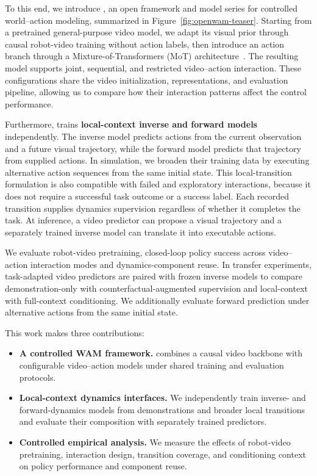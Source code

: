 To this end, we introduce \textbf{\ours}, an open framework and model series for controlled world--action modeling, summarized in Figure~\ref{fig:openwam-teaser}. Starting from a pretrained general-purpose video model, we adapt its visual prior through causal robot-video training without action labels, then introduce an action branch through a Mixture-of-Transformers (MoT) architecture~\cite{liang2024mixture}. The resulting model supports joint, sequential, and restricted video--action interaction. These configurations share the video initialization, representations, and evaluation pipeline, allowing us to compare how their interaction patterns affect the control performance.

Furthermore, \ours trains \textbf{local-context inverse and forward models} independently. The inverse model predicts actions from the current observation and a future visual trajectory, while the forward model predicts that trajectory from supplied actions.
In simulation, we broaden their training data by executing alternative action sequences from the same initial state.
This local-transition formulation is also compatible with failed and exploratory interactions, because it does not require a successful task outcome or a success label.
Each recorded transition supplies dynamics supervision regardless of whether it completes the task. At inference, a video predictor can propose a visual trajectory and a separately trained inverse model can translate it into executable actions.

We evaluate robot-video pretraining, closed-loop policy success across
video--action interaction modes and dynamics-component reuse. In transfer experiments, task-adapted video predictors are paired with frozen inverse models to compare demonstration-only with counterfactual-augmented supervision and local-context with full-context conditioning. We additionally evaluate forward prediction under alternative actions from the same initial state.

This work makes three contributions:
\begin{itemize}
  \item \textbf{A controlled WAM framework.} \ours combines a causal video backbone with configurable video--action models under shared training and evaluation protocols.
  \item \textbf{Local-context dynamics interfaces.} We independently train inverse- and forward-dynamics models from demonstrations and broader local transitions and evaluate their composition with separately trained predictors.
  \item \textbf{Controlled empirical analysis.} We measure the effects of robot-video pretraining, interaction design, transition coverage, and conditioning context on policy performance and component reuse.
\end{itemize}

